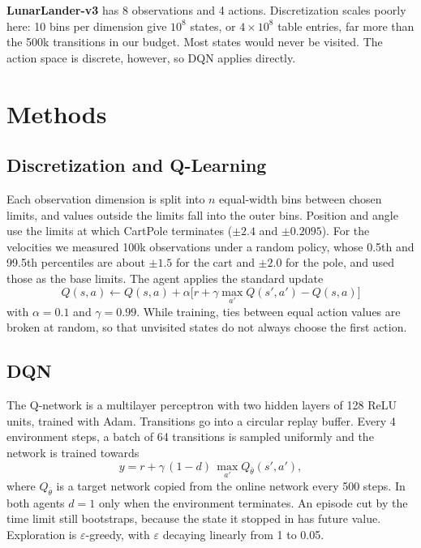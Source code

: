 \documentclass[10pt,twocolumn]{article}
\begin{document}
\textbf{LunarLander-v3} has 8 observations and 4 actions. Discretization scales poorly here: 10 bins per dimension give $10^8$ states, or $4\times10^8$ table entries, far more than the 500k transitions in our budget. Most states would never be visited. The action space is discrete, however, so DQN applies directly.

\section{Methods}
\subsection{Discretization and Q-Learning}
Each observation dimension is split into $n$ equal-width bins between chosen limits, and values outside the limits fall into the outer bins. Position and angle use the limits at which CartPole terminates ($\pm2.4$ and $\pm0.2095$). For the velocities we measured 100k observations under a random policy, whose 0.5th and 99.5th percentiles are about $\pm1.5$ for the cart and $\pm2.0$ for the pole, and used those as the base limits. The agent applies the standard update \cite{sutton2018}
\begin{equation}
Q(s,a) \leftarrow Q(s,a) + \alpha\big[r + \gamma \max_{a'} Q(s',a') - Q(s,a)\big]
\end{equation}
with $\alpha=0.1$ and $\gamma=0.99$. While training, ties between equal action values are broken at random, so that unvisited states do not always choose the first action.

\subsection{DQN}
The Q-network is a multilayer perceptron with two hidden layers of 128 ReLU units, trained with Adam. Transitions go into a circular replay buffer. Every 4 environment steps, a batch of 64 transitions is sampled uniformly and the network is trained towards
\begin{equation}
y = r + \gamma\,(1-d)\,\max_{a'} Q_{\bar\theta}(s',a'),
\end{equation}
where $Q_{\bar\theta}$ is a target network copied from the online network every 500 steps. In both agents $d=1$ only when the environment terminates. An episode cut by the time limit still bootstraps, because the state it stopped in has future value. Exploration is $\varepsilon$-greedy, with $\varepsilon$ decaying linearly from 1 to 0.05.
\end{document}
